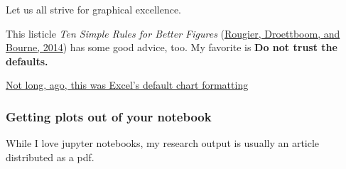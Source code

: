 \documentclass[11pt]{article}
\begin{document}
Let us all strive for graphical excellence.

This listicle \emph{Ten Simple Rules for Better Figures}
(\href{https://journals.plos.org/ploscompbiol/article?id=10.1371/journal.pcbi.1003833\#s10}{Rougier,
Droettboom, and Bourne, 2014}) has some good advice, too. My favorite is
\textbf{Do not trust the defaults.}

\href{http://media.juiceanalytics.com/images/blog/excel_line_graph.png}{Not
long, ago, this was Excel's default chart formatting}

    \hypertarget{getting-plots-out-of-your-notebook}{%
\subsubsection{Getting plots out of your
notebook}\label{getting-plots-out-of-your-notebook}}

While I love jupyter notebooks, my research output is usually an article
distributed as a pdf.
\end{document}
